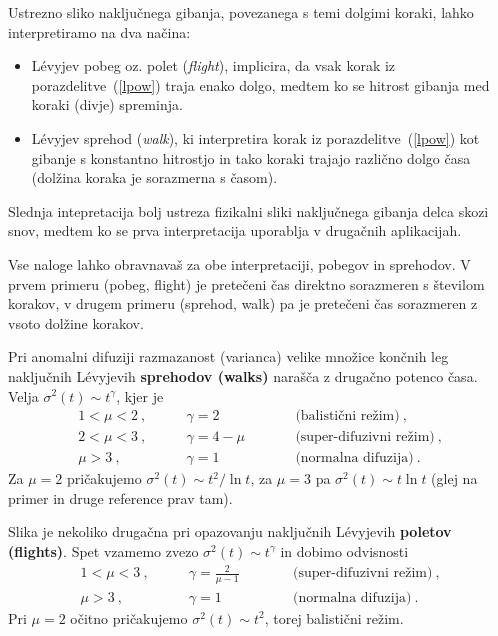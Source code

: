 \documentclass[a4paper, 12pt, slovene]{article}
\begin{document}
Ustrezno sliko naključnega gibanja, povezanega s temi dolgimi koraki, lahko interpretiramo na dva načina:
\begin{itemize}
  \item L\'evyjev pobeg oz. polet ({\sl flight\/}), implicira, da vsak korak iz porazdelitve~(\ref{lpow}) traja enako dolgo, medtem ko se hitrost gibanja med koraki (divje) spreminja.
  \item L\'evyjev sprehod ({\sl walk\/}), ki interpretira korak iz porazdelitve~(\ref{lpow}) kot  gibanje s konstantno hitrostjo in tako koraki trajajo različno dolgo časa (dolžina koraka je sorazmerna s časom).
\end{itemize}

Slednja intepretacija bolj ustreza fizikalni sliki naključnega gibanja delca skozi snov, medtem ko se prva interpretacija uporablja v druga\v cnih aplikacijah.

Vse naloge lahko obravnavaš za obe interpretaciji, pobegov in sprehodov. V prvem primeru (pobeg, flight) je prete\v ceni \v cas direktno sorazmeren s \v stevilom korakov, v drugem primeru (sprehod, walk) pa je prete\v ceni \v cas  sorazmeren z vsoto dol\v zine korakov.


Pri anomalni difuziji razmazanost (varianca) velike množice končnih leg naključnih L\'evyjevih \textbf{sprehodov (walks)} narašča z drugačno potenco časa.
Velja $\sigma^2(t) \sim t^\gamma$, kjer je
\begin{align*}
1 < \mu < 2 \>, &\qquad \gamma = 2 \> &\qquad&  \text{(balistični režim)}\>, \\
2 < \mu < 3 \>, &\qquad \gamma = 4 - \mu &\qquad&  \text{(super-difuzivni režim)}\>, \\
    \mu > 3 \>, &\qquad \gamma = 1 &\qquad&  \text{(normalna difuzija)} \>.
\end{align*}
Za $\mu=2$ pričakujemo $\sigma^2(t) \sim t^2 / \ln t$,
za $\mu=3$ pa $\sigma^2(t) \sim t \ln t$ (glej na primer \cite{weeks}
in druge reference prav tam).

Slika je nekoliko drugačna pri opazovanju naključnih L\'evyjevih \textbf{poletov (flights)}.
Spet vzamemo zvezo $\sigma^2(t) \sim t^\gamma$ in dobimo odvisnosti
\begin{align*}
1 < \mu < 3 \>, &\qquad \gamma = \frac{2}{\mu-1} \> &\qquad&  \text{(super-difuzivni režim)}\>, \\
    \mu > 3 \>, &\qquad \gamma = 1 &\qquad&  \text{(normalna difuzija)} \>.
\end{align*}
Pri $\mu=2$ očitno pričakujemo $\sigma^2(t) \sim t^2 $, torej balistični režim.
\newline
\end{document}
